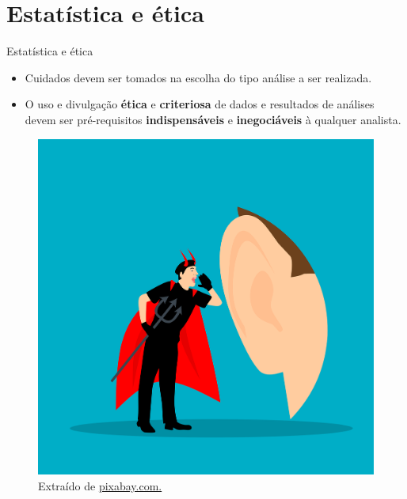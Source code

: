 \documentclass[
  ignorenonframetext,
  serif,
  professionalfont,
  usenames,
  dvipsnames,
  aspectratio = 169]{beamer}
\providecommand{\tightlist}{%
  \setlength{\itemsep}{0pt}\setlength{\parskip}{0pt}}
\renewcommand{\tightlist}{%
  \setlength{\itemsep}{0\baselineskip}
  \setlength{\parskip}{0.25\baselineskip}
}
\def\beginAHalfColumn{\begin{minipage}{0.49\textwidth}}%
\def\endColumns{\end{minipage}}%
\begin{document}
\section{Estatística e ética}\label{estatuxedstica-e-uxe9tica}

\begin{frame}{Estatística e ética}
\label{estatuxedstica-e-uxe9tica-1}
\beginAHalfColumn

\begin{itemize}
\tightlist
\item
  Cuidados devem ser tomados na escolha do tipo análise a ser realizada.
\end{itemize}

\vspace{0.3cm}

\begin{itemize}
\tightlist
\item
  O uso e divulgação \textbf{ética} e \textbf{criteriosa} de dados e
  resultados de análises devem ser pré-requisitos
  \textbf{indispensáveis} e \textbf{inegociáveis} à qualquer analista.
\end{itemize}

\endColumns
\beginAHalfColumn

\begin{figure}

{\centering \includegraphics[width=0.75\linewidth]{./img/etica} 

}

\caption{Extraído de \href{https://cdn.pixabay.com/photo/2021/11/13/18/48/devil-6792088_1280.png}{pixabay.com.}}\label{fig:unnamed-chunk-8}
\end{figure}

\endColumns
\end{frame}
\end{document}
